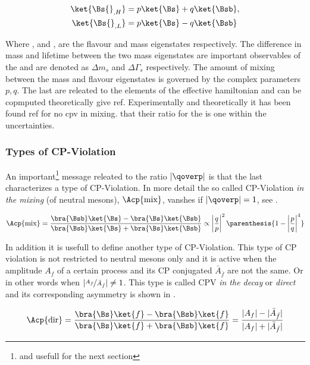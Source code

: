 \begin{align}
\ket{\Bs{}_{,H}} &= p \ket{\Bs} + q \ket{\Bsb}, \nonumber \\
\ket{\Bs{}_{,L}} &= p \ket{\Bs} - q \ket{\Bsb}
\label{bs_mass_eigen}
\end{align}

\noindent Where \ket{\Bs}, \ket{\Bsb} and ,  are the flavour and mass
eigenstates respectively. The difference in mass and lifetime between the two mass eigenstates are important
observables of the \BBbarSyst and are denoted as $\Delta m_s$ and $\Delta\Gamma_s$ respectively.
The amount of mixing between the mass and flavour eigenstates is governed by
the complex parameters $p,q$. The last are releated to the elements of the effective hamiltonian and can be
copmputed theoretically{\color{red} give ref}. Experimentally and theoretically it has been found{\color{red} ref for no cpv in mixing.}
that their ratio for the \BBbarSyst is one within the uncertainties.

\subsubsection{Types of CP-Violation}
An important\footnote{and usefull for the next section} message releated to the ratio $|\qoverp|$ is that
the last characterizes a type of CP-Violation. In more detail the so called CP-Violation {\it in the mixing} (of neutral mesons),
$\Acp{\text{mix}}$, vanshes if $|\qoverp|= 1$, see .

\begin{equation}
\Acp{\text{mix}}      = \frac{\bra{\Bsb}\ket{\Bs} - \bra{\Bs}\ket{\Bsb}} {\bra{\Bsb}\ket{\Bs} + \bra{\Bs}\ket{\Bsb}}
                \propto \left|\frac{q}{p}\right|^2 \parenthesis{ 1 - \left|\frac{p}{q}\right|^4}
\label{acp_mixing}
\end{equation}

\noindent In addition it is usefull to define another type of CP-Violation.
This type of CP violation is not restricted to neutral mesons only and it is active when the amplitude $A_f$ of a certain
process and its CP conjugated $\bar{A}_{\bar{f}}$ are not the same. Or in other words when $|\nicefrac{A_f}{\bar{A}_{\bar{f}}}| \neq 1$.
This type is called CPV {\it in the decay} or {\it direct} and its corresponding asymmetry is shown in .

\begin{equation}
\Acp{\text{dir}} = \frac{ \bra{\Bs}\ket{f} - \bra{\Bsb}\ket{f} } {\bra{\Bs}\ket{f} + \bra{\Bsb}\ket{f}}
                = \frac{ |A_f| - |\bar{A}_{\bar{f}}| } { |A_f| + |\bar{A}_{\bar{f}}|}
\label{cpv_decay}
\end{equation}


